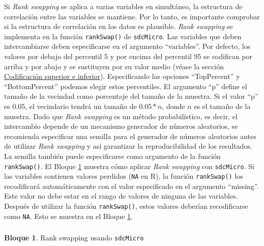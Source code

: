 \documentclass[
]{book}
\newenvironment{Shaded}{\begin{snugshade}}{\end{snugshade}}
\newcommand{\CommentTok}[1]{\textcolor[rgb]{0.56,0.35,0.01}{\textit{#1}}}
\newcommand{\DecValTok}[1]{\textcolor[rgb]{0.00,0.00,0.81}{#1}}
\newcommand{\FunctionTok}[1]{\textcolor[rgb]{0.00,0.00,0.00}{#1}}
\newcommand{\NormalTok}[1]{#1}
\newcommand{\SpecialCharTok}[1]{\textcolor[rgb]{0.00,0.00,0.00}{#1}}
\theoremstyle{definition}
\theoremstyle{definition}
\newtheorem{example}{Bloque}[chapter]
\theoremstyle{definition}
\theoremstyle{definition}
\theoremstyle{remark}
\begin{document}
Si \emph{Rank swapping} se aplica a varias variables en simultáneo, la estructura de correlación entre las variables se mantiene. Por lo tanto, es importante comprobar si la estructura de correlación en los datos es plausible. \emph{Rank swapping} se implementa en la función \texttt{rankSwap()} de \texttt{sdcMicro}. Las variables que deben intercambiarse deben especificarse en el argumento ``variables''. Por defecto, los valores por debajo del percentil 5 y por encima del percentil 95 se codifican por arriba y por abajo y se sustituyen por su valor medio (véase la sección \protect\hyperlink{cod-sup-inf}{Codificación superior e inferior}). Especificando las opciones ``TopPercent'' y ``BottomPercent'' podemos elegir estos percentiles. El argumento ``p'' define el tamaño de la vecindad como porcentaje del tamaño de la muestra. Si el valor ``p'' es 0.05, el vecindario tendrá un tamaño de \(0.05 * n\), donde \(n\) es el tamaño de la muestra. Dado que \emph{Rank swapping} es un método probabilístico, es decir, el intercambio depende de un mecanismo generador de números aleatorios, se recomienda especificar una semilla para el generador de números aleatorios antes de utilizar \emph{Rank swapping} y así garantizar la reproducibilidad de los resultados. La semilla también puede especificarse como argumento de la función \texttt{rankSwap()}. El Bloque \ref{exm:bloque37jgm} muestra cómo aplicar \emph{Rank swapping} con \texttt{sdcMicro}. Si las variables contienen valores perdidos (\texttt{NA} en R), la función \texttt{rankSwap()} los recodificará automáticamente con el valor especificado en el argumento ``missing''. Este valor no debe estar en el rango de valores de ninguna de las variables. Después de utilizar la función \texttt{rankSwap()}, estos valores deberían recodificarse como \texttt{NA}. Esto se muestra en el Bloque \ref{exm:bloque37jgm}.

\hypertarget{section-11}{%
\subsubsection{}\label{section-11}}

\begin{example}
\protect\hypertarget{exm:bloque37jgm}{}\label{exm:bloque37jgm}Rank swapping usando \texttt{sdcMicro}
\end{example}

\begin{Shaded}
\end{Shaded}
\end{document}
